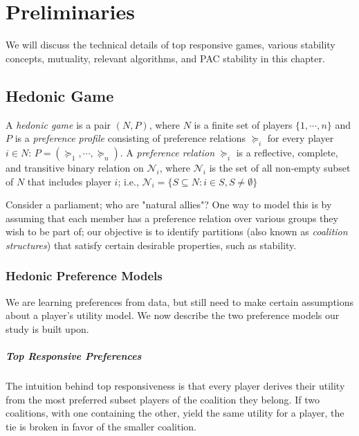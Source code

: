 
\chapter{Preliminaries}
\label{ch:preliminaries}
\vspace{2em}

We will discuss the technical details of top responsive games,
various stability concepts, mutuality, relevant algorithms, and PAC stability in this chapter.

\section{Hedonic Game}
A \textit{hedonic game} is a pair $(N, P)$, where $N$ is a finite set of players $\{1, \cdots, n\}$ and $P$ is a \textit{preference profile} consisting of preference relations $\succeq_i$ for every player $i \in N$: $P = (\succeq_1, \cdots, \succeq_n)$. A \textit{preference relation} $\succeq_i$ is a reflective, complete, and transitive binary relation on $\mathcal{N}_i$, where $\mathcal{N}_i$ is the set of all non-empty subset of $N$ that includes player $i$; i.e., $\mathcal{N}_i = \{S \subseteq N: i \in S, S \neq \emptyset \}$

Consider a parliament; who are "natural allies"? One way to model this is by assuming that each member has a preference relation over various groups they wish to be part of; our objective is to identify partitions (also known as \textit{coalition structures}) that satisfy certain desirable properties, such as stability.

\subsection{Hedonic Preference Models}
We are learning preferences from data, but still need to make certain assumptions about a player's utility model. We now describe the two preference models our study is built upon.

\paragraph{Top Responsive Preferences}
The intuition behind top responsiveness is that every player derives their utility from the most preferred subset players of the coalition they belong. If two coalitions, with one containing the other, yield the same utility for a player, the tie is broken in favor of the smaller coalition. 

